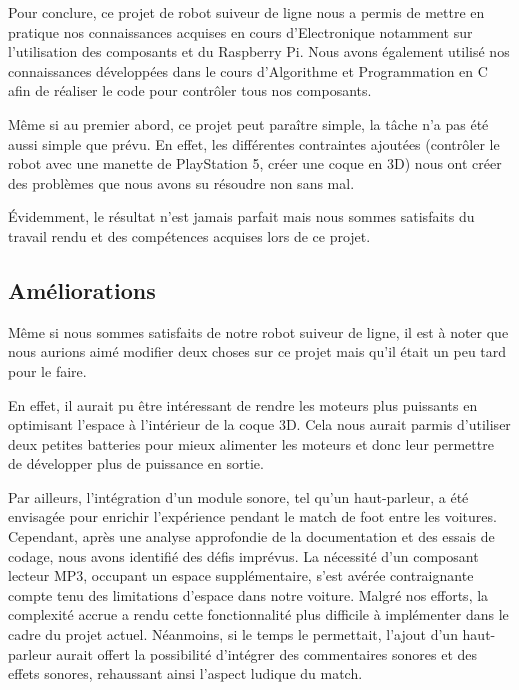 Pour conclure, ce projet de robot suiveur de ligne nous a permis de mettre en pratique nos connaissances acquises en cours d'Electronique notamment sur l'utilisation des composants et du Raspberry Pi. Nous avons également utilisé nos connaissances développées dans le cours d'Algorithme et Programmation en C afin de réaliser le code pour contrôler tous nos composants.

Même si au premier abord, ce projet peut paraître simple, la tâche n'a pas été aussi simple que prévu. En effet, les différentes contraintes ajoutées (contrôler le robot avec une manette de PlayStation 5, créer une coque en 3D) nous ont créer des problèmes que nous avons su résoudre non sans mal.

Évidemment, le résultat n'est jamais parfait mais nous sommes satisfaits du travail rendu et des compétences acquises lors de ce projet.

\subsection{Améliorations}
Même si nous sommes satisfaits de notre robot suiveur de ligne, il est à noter que nous aurions aimé modifier deux choses sur ce projet mais qu'il était un peu tard pour le faire.

En effet, il aurait pu être intéressant de rendre les moteurs plus puissants en optimisant l'espace à l'intérieur de la coque 3D. Cela nous aurait parmis d'utiliser deux petites batteries pour mieux alimenter les moteurs et donc leur permettre de développer plus de puissance en sortie.

Par ailleurs, l'intégration d'un module sonore, tel qu'un haut-parleur, a été envisagée pour enrichir l'expérience pendant le match de foot entre les voitures. Cependant, après une analyse approfondie de la documentation et des essais de codage, nous avons identifié des défis imprévus. La nécessité d'un composant lecteur MP3, occupant un espace supplémentaire, s'est avérée contraignante compte tenu des limitations d'espace dans notre voiture. Malgré nos efforts, la complexité accrue a rendu cette fonctionnalité plus difficile à implémenter dans le cadre du projet actuel. Néanmoins, si le temps le permettait, l'ajout d'un haut-parleur aurait offert la possibilité d'intégrer des commentaires sonores et des effets sonores, rehaussant ainsi l'aspect ludique du match.
\newpage
